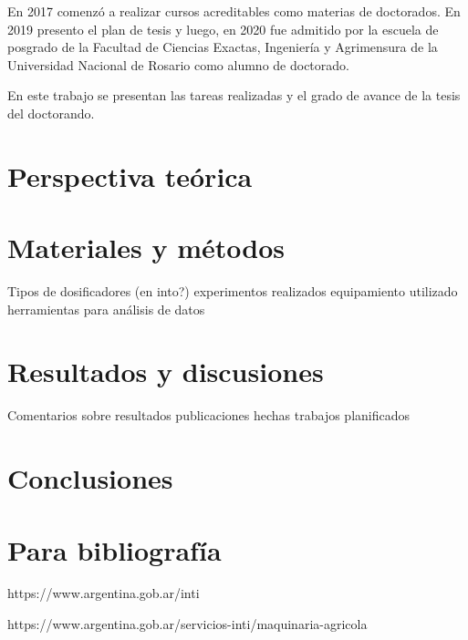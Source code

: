 \documentclass[12pt]{article}
\begin{document}
    En 2017 comenzó a realizar cursos acreditables como materias de doctorados. En 2019 presento el plan de tesis y luego, en 2020 fue admitido por la escuela de posgrado de la Facultad de Ciencias Exactas, Ingeniería y Agrimensura de la Universidad Nacional de Rosario como alumno de doctorado.
    
    En este trabajo se presentan las tareas realizadas y el grado de avance de la tesis del doctorando.
    
    \section{Perspectiva teórica}
    
    
    
    \section{Materiales y métodos}

    Tipos de dosificadores (en into?) 
    experimentos realizados
    equipamiento utilizado
    herramientas para análisis de datos    
    
    
    \section{Resultados y discusiones}
    
    Comentarios sobre resultados
    publicaciones hechas
    trabajos planificados
    
    
	\section{Conclusiones}
	
	\section{Para bibliografía}
	
	https://www.argentina.gob.ar/inti
	
    https://www.argentina.gob.ar/servicios-inti/maquinaria-agricola
    
\end{document}
